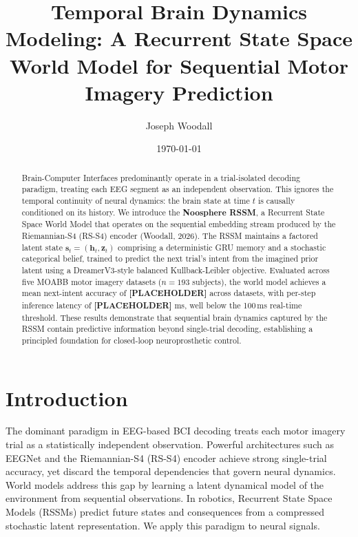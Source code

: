 \documentclass[11pt,a4paper]{article}
\title{\textbf{Temporal Brain Dynamics Modeling: A Recurrent State Space World Model for Sequential Motor Imagery Prediction}}
\author[1]{Joseph Woodall}
\date{\today}
\begin{document}
\maketitle

\begin{abstract}
Brain-Computer Interfaces predominantly operate in a trial-isolated decoding paradigm, treating each EEG segment as an independent observation. This ignores the temporal continuity of neural dynamics: the brain state at time $t$ is causally conditioned on its history. We introduce the \textbf{Noosphere RSSM}, a Recurrent State Space World Model that operates on the sequential embedding stream produced by the Riemannian-S4 (RS-S4) encoder (Woodall, 2026). The RSSM maintains a factored latent state $\mathbf{s}_t = (\mathbf{h}_t, \mathbf{z}_t)$ comprising a deterministic GRU memory and a stochastic categorical belief, trained to predict the next trial's intent from the imagined prior latent using a DreamerV3-style balanced Kullback-Leibler objective. Evaluated across five MOABB motor imagery datasets ($n=193$ subjects), the world model achieves a mean next-intent accuracy of \textbf{[PLACEHOLDER]} across datasets, with per-step inference latency of \textbf{[PLACEHOLDER]} ms, well below the 100\,ms real-time threshold. These results demonstrate that sequential brain dynamics captured by the RSSM contain predictive information beyond single-trial decoding, establishing a principled foundation for closed-loop neuroprosthetic control.
\end{abstract}

\section{Introduction}
The dominant paradigm in EEG-based BCI decoding treats each motor imagery trial as a statistically independent observation. Powerful architectures such as EEGNet \cite{lawhern2018eegnet} and the Riemannian-S4 (RS-S4) encoder \cite{woodall2026rss4} achieve strong single-trial accuracy, yet discard the temporal dependencies that govern neural dynamics. World models \cite{ha2018worldmodels, hafner2019dreamer} address this gap by learning a latent dynamical model of the environment from sequential observations. In robotics, Recurrent State Space Models (RSSMs) predict future states and consequences from a compressed stochastic latent representation. We apply this paradigm to neural signals.
\end{document}
